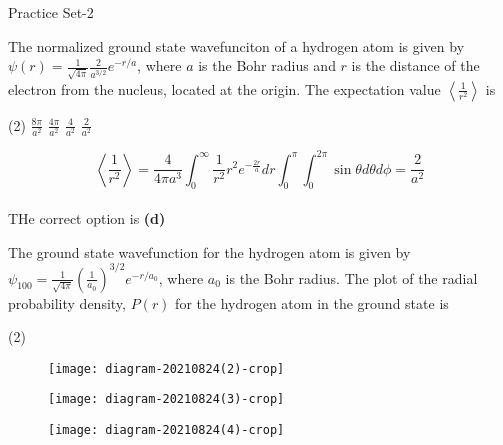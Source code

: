\newpage
\begin{abox}
	Practice Set-2
	\end{abox}
\begin{enumerate}
	\begin{minipage}{\textwidth}
		\item The normalized ground state wavefunciton of a hydrogen atom is given by $\psi(r)=\frac{1}{\sqrt{4 \pi}} \frac{2}{a^{3 / 2}} e^{-r / a}$, where $a$ is the Bohr radius and $r$ is the distance of the electron from the nucleus, located at the origin. The expectation value $\left\langle\frac{1}{r^{2}}\right\rangle$ is
	\end{minipage}
	\begin{tasks}(2)
		\task[\textbf{A.}] $\frac{8 \pi}{a^{2}}$
		\task[\textbf{B.}]$\frac{4 \pi}{a^{2}}$
		\task[\textbf{C.}]$\frac{4}{a^{2}}$
		\task[\textbf{D.}]$\frac{2}{a^{2}}$
	\end{tasks}
	\begin{answer}
		$$\left\langle\frac{1}{r^{2}}\right\rangle=\frac{4}{4 \pi a^{3}} \int_{0}^{\infty} \frac{1}{r^{2}} r^{2} e^{-\frac{2 r}{a}} d r \int_{0}^{\pi} \int_{0}^{2 \pi} \sin \theta d \theta d \phi=\frac{2}{a^{2}}$$\\
		THe correct option is \textbf{(d)}
	\end{answer}
	\begin{minipage}{\textwidth}
		\item The ground state wavefunction for the hydrogen atom is given by $\psi_{100}=\frac{1}{\sqrt{4 \pi}}\left(\frac{1}{a_{0}}\right)^{3 / 2} e^{-r / a_{0}}$, where $a_{0}$ is the Bohr radius. The plot of the radial probability density, $P(r)$ for the hydrogen atom in the ground state is
	\end{minipage}
	\begin{tasks}(2)
		\task[\textbf{A.}]\begin{figure}[H]
			\centering
			\texttt{[image: diagram-20210824(2)-crop]}
			
		\end{figure}
		\task[\textbf{B.}]\begin{figure}[H]
			\centering
			\texttt{[image: diagram-20210824(3)-crop]}
			
		\end{figure}
		\task[\textbf{C.}]\begin{figure}[H]
			\centering
			\texttt{[image: diagram-20210824(4)-crop]}
			

\end{figure}
\end{tasks}
\end{enumerate}
